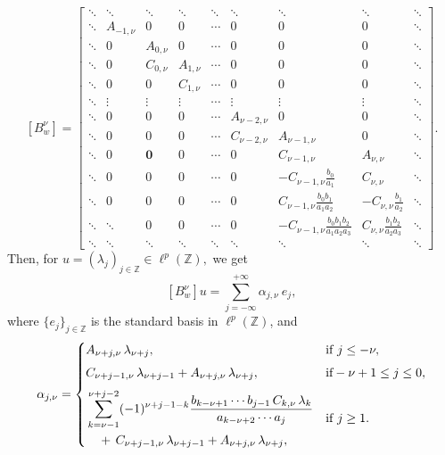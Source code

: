 \documentclass[12pt, reqno]{amsart}
\theoremstyle{definition}
\theoremstyle{remark}
\numberwithin{equation}{section}
\begin{document}
 \begin{equation}\label{matrix}
  [B_w^{\nu}]=
  \begin{bmatrix}
  \ddots&  \ddots & \ddots & \ddots & \ddots&\ddots&\ddots&\ddots&\ddots\\
   \ddots & A_{-1,\nu}&0&0&\cdots&0&0&0&\ddots\\
   \ddots & 0& A_{0,\nu}&0&\cdots&0&0&0&\ddots\\
  \ddots & 0& C_{0,\nu}&A_{1,\nu}&\cdots&0&0&0&\ddots\\
  \ddots & 0& 0&C_{1,\nu}& \cdots&0&0&0&\ddots\\
  \ddots & \vdots& \vdots&\vdots& \cdots&\vdots&\vdots&\vdots&\ddots\\
\ddots& 0 & 0&0 & \cdots&A_{\nu-2,\nu}&0&0 &\ddots\\
\ddots& 0 & 0 & 0&\cdots&C_{\nu-2,\nu}&A_{\nu-1,\nu}&0&\ddots\\
  \ddots &0&\boxed{\boldsymbol{0}} &0&\cdots &0&C_{\nu-1,\nu}& A_{\nu,\nu}&\ddots\\
	\ddots &0&0& 0&\cdots&0&-C_{\nu-1,\nu}\frac{b_{0}}{a_{1}}& C_{\nu,\nu}&\ddots\\
	\ddots  & 0&0&0 &\cdots&0&C_{\nu-1,\nu}\frac{b_{0}b_{1}}{a_{1}a_{2}}&-C_{\nu,\nu}\frac{b_{1}}{a_{2}}&\ddots\\
 \ddots  & \ddots&0&0&\cdots&0&-C_{\nu-1,\nu}\frac{b_{0}b_{1}b_{2}}{a_{1}a_{2}a_{3}}&C_{\nu,\nu}\frac{b_{1}b_{2}}{a_{2}a_{3}}&\ddots\\
	  \ddots & \ddots&\ddots&\ddots &\ddots&\ddots&\ddots&\ddots&\ddots 
	\end{bmatrix}.
 \end{equation}
Then, for $u=(\lambda_{j})_{j\in \mathbb{Z}}\in \ell^{p}(\mathbb{Z}),$ we get
\begin{equation}\label{cc}
   [B_{w}^{\nu}]u=\sum_{j=-\infty}^{+\infty} \alpha_{j,\nu} ~ e_{j},
\end{equation}
where $\{e_{j}\}_{j\in \mathbb{Z}}$ is the standard basis in $\ell^p(\mathbb{Z})$, and 
\[
\alpha_{j,\nu} =
\begin{cases}
A_{\nu+j,\nu}\,\lambda_{\nu+j}, 
& \text{if } j \leq -\nu,\\[4pt]
C_{\nu+j-1,\nu}\,\lambda_{\nu+j-1}
   +A_{\nu+j,\nu}\,\lambda_{\nu+j},
& \text{if} -\nu+1\leq j\leq 0,\\[6pt]
\begin{aligned}
\displaystyle&
\sum_{k=\nu-1}^{\nu+j-2}
(-1)^{\nu+j-1-k}
\frac{b_{k-\nu+1}\cdots b_{j-1}\,C_{k,\nu}\,\lambda_{k}}
     {a_{k-\nu+2}\cdots a_{j}}\\
&\quad +\,C_{\nu+j-1,\nu}\,\lambda_{\nu+j-1}
      +A_{\nu+j,\nu}\,\lambda_{\nu+j},
\end{aligned}
& \text{if } j\ge 1.
\end{cases}
\]
\end{document}
